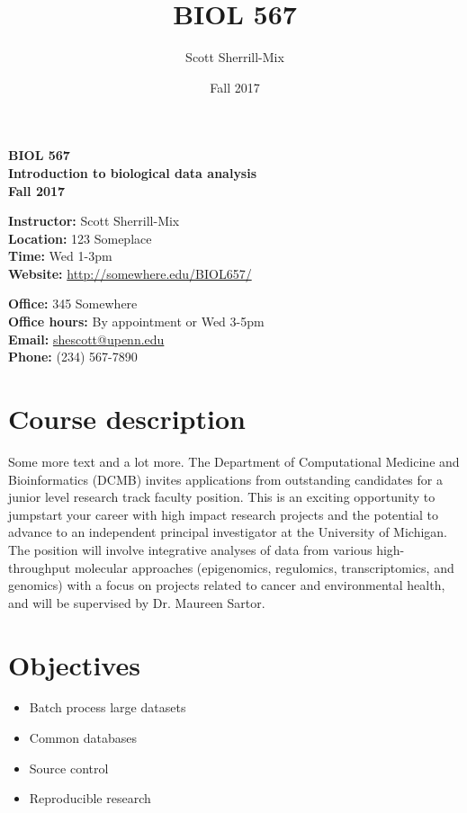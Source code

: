 \documentclass[12pt]{article}
\title{BIOL 567}
\date{Fall 2017}
\author{Scott Sherrill-Mix}
\begin{document}
\thispagestyle{plain}
\begin{center}
\Large{\textbf{BIOL 567\\ Introduction to biological data analysis}}\\
\Large{\textbf{Fall 2017}}
\end{center}
\bigskip

\noindent
\textbf{Instructor:} Scott Sherrill-Mix\\
\textbf{Location:} 123 Someplace\\
\textbf{Time:} Wed 1-3pm\\
\textbf{Website:} \url{http://somewhere.edu/BIOL657/}\\
\bigskip

\noindent
\textbf{Office:} 345 Somewhere\\
\textbf{Office hours:} By appointment or Wed 3-5pm\\
\textbf{Email:} \href{mailto:shescott@upenn.edu}{shescott@upenn.edu}\\
\textbf{Phone:} (234) 567-7890

\section*{Course description}
Some more text and a lot more. The Department of Computational Medicine and Bioinformatics (DCMB) invites applications from outstanding candidates for a junior level research track faculty position. This is an exciting opportunity to jumpstart your career with high impact research projects and the potential to advance to an independent principal investigator at the University of Michigan. The position will involve integrative analyses of data from various high-throughput molecular approaches (epigenomics, regulomics, transcriptomics, and genomics) with a focus on projects related to cancer and environmental health, and will be supervised by Dr. Maureen Sartor. 

\section*{Objectives}
\begin{itemize}
	\item Batch process large datasets
	\item Common databases
	\item Source control
	\item Reproducible research
\end{itemize}
\end{document}
